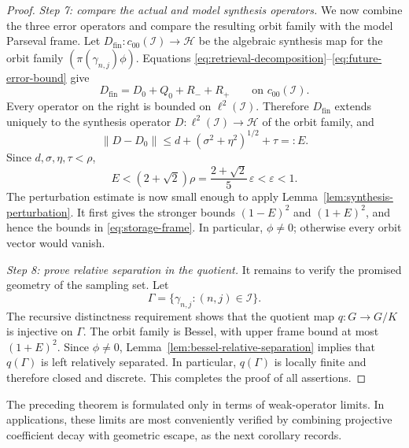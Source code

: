 \documentclass[reqno]{amsart}
\numberwithin{equation}{section}
\theoremstyle{definition}
\theoremstyle{remark}
\newcommand{\cH}{\mathcal H}
\newcommand{\cI}{\mathcal I}
\newcommand{\Step}[1]{\par\medskip\noindent\textit{#1.}\quad}
\begin{document}
\begin{proof}
\Step{Step 7: compare the actual and model synthesis operators}
We now combine the three error operators and compare the resulting orbit
family with the model Parseval frame.  Let
$D_{\mathrm{fin}}:c_{00}(\cI)\to\cH$ be the algebraic synthesis map for the
orbit family $(\pi(\gamma_{n,j})\phi)$.  Equations
\eqref{eq:retrieval-decomposition}--\eqref{eq:future-error-bound} give
\begin{equation}\label{eq:synthesis-decomposition}
 D_{\mathrm{fin}}=D_0+Q_0+R_-+R_+
 \qquad\text{on }c_{00}(\cI).
\end{equation}
Every operator on the right is bounded on $\ell^2(\cI)$.  Therefore
$D_{\mathrm{fin}}$ extends uniquely to the synthesis operator
$D:\ell^2(\cI)\to\cH$ of the orbit family, and
\begin{equation}\label{eq:total-error}
 \|D-D_0\|
 \leq d+(\sigma^2+\eta^2)^{1/2}+\tau=:E.
\end{equation}
Since $d,\sigma,\eta,\tau<\rho$,
\begin{equation}\label{eq:error-budget-final}
 E<(2+\sqrt2)\rho
   =\frac{2+\sqrt2}{5}\,\varepsilon
   <\varepsilon<1.
\end{equation}
The perturbation estimate is now small enough to apply
Lemma~\ref{lem:synthesis-perturbation}.  It first gives the stronger bounds
$(1-E)^2$ and $(1+E)^2$, and hence the bounds in \eqref{eq:storage-frame}.
In particular, $\phi\neq0$; otherwise every orbit vector would vanish.

\Step{Step 8: prove relative separation in the quotient}
It remains to verify the promised geometry of the sampling set.  Let
\[
 \Gamma=\{\gamma_{n,j}:(n,j)\in\cI\}.
\]
The recursive distinctness requirement shows that the quotient map
$q:G\to G/K$ is injective on $\Gamma$.  The orbit family is Bessel, with
upper frame bound at most $(1+E)^2$.  Since $\phi\neq0$,
Lemma~\ref{lem:bessel-relative-separation} implies that $q(\Gamma)$ is left
relatively separated.  In particular, $q(\Gamma)$ is locally finite and
therefore closed and discrete.  This completes the proof of all assertions.
\end{proof}

The preceding theorem is formulated only in terms of weak-operator limits.
In applications, these limits are most conveniently verified by combining
projective coefficient decay with geometric escape, as the next corollary
records.
\end{document}

